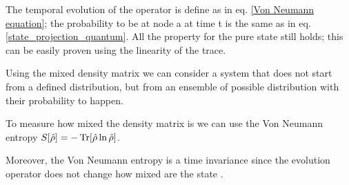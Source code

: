 The temporal evolution of the operator is define as in eq. \eqref{Von Neumann equation}; the probability to be at node a at time t is the same as in eq. \eqref{state_projection_quantum}. All the property for the pure state still holds; this can be easily proven using the linearity of the trace.

Using the mixed density matrix we can consider a system that does not start from a defined distribution, but from an ensemble of possible distribution with their probability to happen. 

To measure how mixed the density matrix is we can use the Von Neumann entropy $S[\hat\rho]=-\operatorname{Tr}[\hat\rho\ln\hat\rho]$.

Moreover, the Von Neumann entropy is a time invariance since the evolution operator does not change how mixed are the state \cite{Nielsen_Chuang_2010}.
\begin{comment}
    \begin{equation}
        \begin{split}
            S[\hat\rho(t)] &=\Tr[\hat\rho(t)\ln\hat\rho(t)]= \Tr[U(t,0)\hat\rho(t)U^\dagger(t,0)\ln\left(U(t,0)\hat\rho(t)U^\dagger(t,0)\right)]\\
            &=\Tr[U(t,0)\hat\rho(0)U^\dagger(t,0)U(t,0)\ln\left(\hat\rho(0)\right)U^\dagger(t,0)]\\
            &= S[\hat\rho(0)].
        \end{split}
    \end{equation}
    We can move out the evolution operator because they are unitary, since if we consider the taylor expansion
    \begin{equation}
        \begin{split}
            \ln\left(U(t,0)\hat\rho(t)U^\dagger(t,0)\right) &= c_0U(t,0)U^\dagger(t,0) + c_1 U(t,0)\hat\rho(t)U^\dagger(t,0)\\
            & \quad + c_2 U(t,0)\hat\rho(t)U^\dagger(t,0)U(t,0)\hat\rho(t)U^\dagger(t,0) + ... \\
            &=  U(t,0)\ln\left(\hat\rho(t)\right) U^\dagger(t,0).
        \end{split}
    \end{equation}
\end{comment}

\begin{comment}
If we consider the system in contact with a thermal bath with which exchange only energy but conserving it in average, namely the canonical condition hold, there is a stationary state $\hat\rho = e^{-\beta \hat L}$ that maximize the entropy. The parameter $\beta$ is just the inverse of a pseudo-temperature that stands for the interaction with the thermal bath. 
Since the thermal bath actively changes the entries of $\hat L$, it is changing the weight of the network and the probability to move from node $i$ to $j$. Thus, we are considering a network that is changing randomly by time. 
The reader can recognize that this density matrix is the same the De Domenico has introduced \eqref{density_matrix}.
\end{comment}

